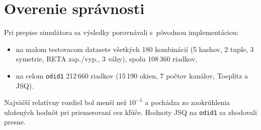 \section{Overenie správnosti}

Pri prepise simulátora sa výsledky porovnávali s~pôvodnou implementáciou:

\begin{itemize}
  \item na malom testovacom datasete všetkých 180 kombinácií (5 hashov, 2 tuple,
        3 symetrie, RETA zap./vyp., 3 váhy), spolu 108\,360 riadkov,
  \item na celom \texttt{odid1} 212\,660 riadkov (15\,190 okien, 7 počtov kanálov, Toeplitz a JSQ).
\end{itemize}

Najväčší relatívny rozdiel bol menší než $10^{-5}$ a pochádza zo zaokrúhlenia uložených
hodnôt pri priemerovaní cez kľúče. Hodnoty JSQ na \texttt{odid1} sa zhodovali presne.

